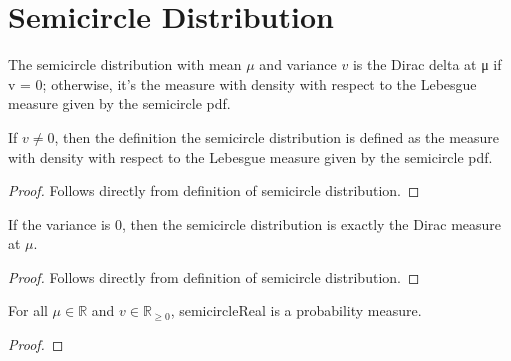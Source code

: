 

\section{Semicircle Distribution}




\begin{definition}
  \label{def:semicircle_distribution}
  \leanok
  The semicircle distribution with mean $\mu$ and variance $v$ is the Dirac delta at μ if v = 0; otherwise, it's the measure with density with respect to the Lebesgue measure given by the semicircle pdf.
\end{definition}

\begin{lemma}
  \label{lem:semicircleReal_of_var_ne_zero}
  \leanok
  If $v \neq 0$, then the definition the semicircle distribution is defined as the measure with density with respect to the Lebesgue measure given by the semicircle pdf.
\end{lemma}

\begin{proof}
  \leanok
  Follows directly from definition of semicircle distribution.
\end{proof}

\begin{lemma}
  \label{lem:semicircleReal_zero_var}
  \leanok
  If the variance is 0, then the semicircle distribution is exactly the Dirac measure at $\mu$.
\end{lemma}

\begin{proof}
  \leanok
  Follows directly from definition of semicircle distribution.
\end{proof}

\begin{lemma} %
  \label{lem:instIsProbabilityMeasuresemicircleReal}
  \leanok

  For all $\mu \in \mathbb{R}$ and $v \in \mathbb{R}_{\ge 0}$, semicircleReal is a probability measure.
\end{lemma}

\begin{proof}
\leanok
\end{proof}

